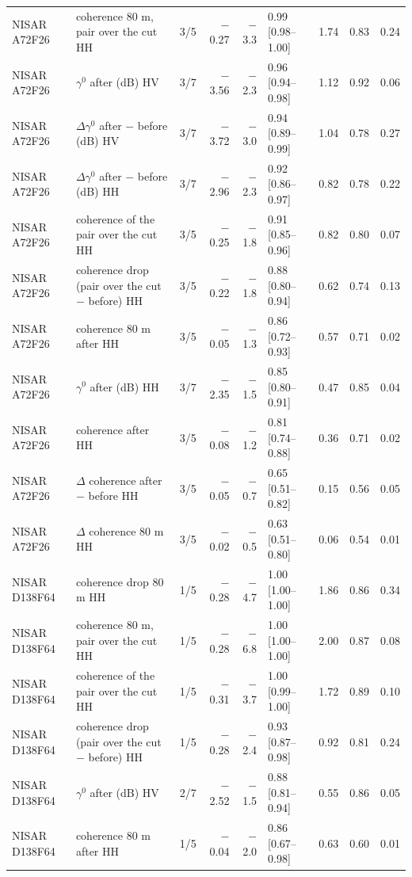 \begin{table}[htbp]
\begin{tabular}{llcrrlrrr}
NISAR A72F26 & coherence 80 m, pair over the cut HH & 3/5 & $-$0.27 & $-$3.3 & 0.99 [0.98--1.00] & 1.74 & 0.83 & 0.24 \\
NISAR A72F26 & $\gamma^0$ after (dB) HV & 3/7 & $-$3.56 & $-$2.3 & 0.96 [0.94--0.98] & 1.12 & 0.92 & 0.06 \\
NISAR A72F26 & $\Delta\gamma^0$ after $-$ before (dB) HV & 3/7 & $-$3.72 & $-$3.0 & 0.94 [0.89--0.99] & 1.04 & 0.78 & 0.27 \\
NISAR A72F26 & $\Delta\gamma^0$ after $-$ before (dB) HH & 3/7 & $-$2.96 & $-$2.3 & 0.92 [0.86--0.97] & 0.82 & 0.78 & 0.22 \\
NISAR A72F26 & coherence of the pair over the cut HH & 3/5 & $-$0.25 & $-$1.8 & 0.91 [0.85--0.96] & 0.82 & 0.80 & 0.07 \\
NISAR A72F26 & coherence drop (pair over the cut $-$ before) HH & 3/5 & $-$0.22 & $-$1.8 & 0.88 [0.80--0.94] & 0.62 & 0.74 & 0.13 \\
NISAR A72F26 & coherence 80 m after HH & 3/5 & $-$0.05 & $-$1.3 & 0.86 [0.72--0.93] & 0.57 & 0.71 & 0.02 \\
NISAR A72F26 & $\gamma^0$ after (dB) HH & 3/7 & $-$2.35 & $-$1.5 & 0.85 [0.80--0.91] & 0.47 & 0.85 & 0.04 \\
NISAR A72F26 & coherence after HH & 3/5 & $-$0.08 & $-$1.2 & 0.81 [0.74--0.88] & 0.36 & 0.71 & 0.02 \\
NISAR A72F26 & $\Delta$ coherence after $-$ before HH & 3/5 & $-$0.05 & $-$0.7 & 0.65 [0.51--0.82] & 0.15 & 0.56 & 0.05 \\
NISAR A72F26 & $\Delta$ coherence 80 m HH & 3/5 & $-$0.02 & $-$0.5 & 0.63 [0.51--0.80] & 0.06 & 0.54 & 0.01 \\
\addlinespace
NISAR D138F64 & coherence drop 80 m HH & 1/5 & $-$0.28 & $-$4.7 & 1.00 [1.00--1.00] & 1.86 & 0.86 & 0.34 \\
NISAR D138F64 & coherence 80 m, pair over the cut HH & 1/5 & $-$0.28 & $-$6.8 & 1.00 [1.00--1.00] & 2.00 & 0.87 & 0.08 \\
NISAR D138F64 & coherence of the pair over the cut HH & 1/5 & $-$0.31 & $-$3.7 & 1.00 [0.99--1.00] & 1.72 & 0.89 & 0.10 \\
NISAR D138F64 & coherence drop (pair over the cut $-$ before) HH & 1/5 & $-$0.28 & $-$2.4 & 0.93 [0.87--0.98] & 0.92 & 0.81 & 0.24 \\
NISAR D138F64 & $\gamma^0$ after (dB) HV & 2/7 & $-$2.52 & $-$1.5 & 0.88 [0.81--0.94] & 0.55 & 0.86 & 0.05 \\
NISAR D138F64 & coherence 80 m after HH & 1/5 & $-$0.04 & $-$2.0 & 0.86 [0.67--0.98] & 0.63 & 0.60 & 0.01 \\

\end{tabular}
\end{table}

